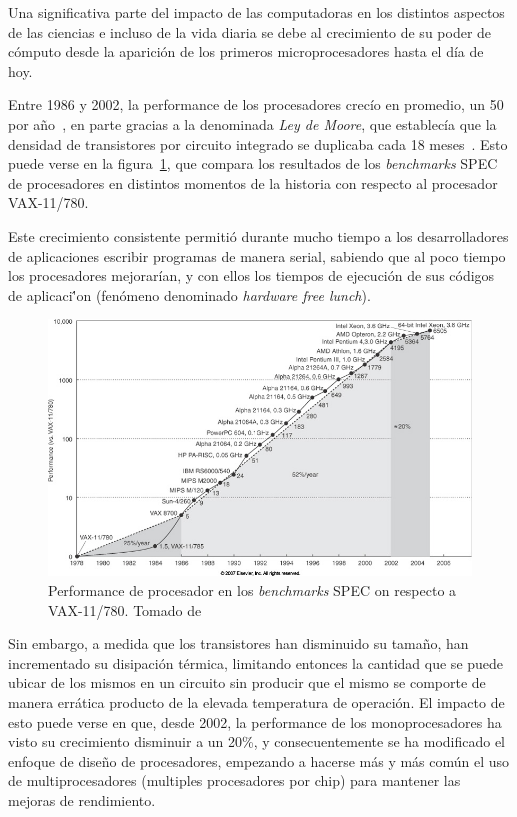 Una significativa parte del impacto de las computadoras en los distintos aspectos de las
ciencias e incluso de la vida diaria se debe al crecimiento de su
poder de c\'omputo desde la aparici\'on de los primeros microprocesadores hasta el
d\'ia de hoy.

Entre 1986 y 2002, la performance de los procesadores crec\'io en promedio, un 50%
por a\~no~\cite{Pacheco}, en parte gracias a la denominada \textit{Ley de Moore}, que
establec\'ia que la densidad de transistores por circuito integrado se duplicaba
cada 18 meses~\cite{HennessyPatterson}. Esto puede verse en la figura~\ref{processor_performance},
que compara los resultados de los \textit{benchmarks} SPEC de procesadores en distintos
momentos de la historia con respecto al procesador VAX-11/780.

Este crecimiento consistente permiti\'o durante mucho tiempo a los desarrolladores
de aplicaciones escribir programas de manera serial, sabiendo que al poco tiempo los procesadores
mejorar\'ian, y con ellos los tiempos de ejecuci\'on de sus c\'odigos de aplicaci\''on (fen\'omeno denominado
\textit{hardware free lunch}).

\begin{figure}[htbp]
    \centering
    \includegraphics[width=\textwidth]{images/processor-performance.jpg}
    \caption{Performance de procesador en los \textit{benchmarks} SPEC on respecto a VAX-11/780. Tomado de~\cite{HennessyPatterson}}
    \label{processor_performance}
\end{figure}

Sin embargo, a medida que los transistores han disminuido su tama\~no, han incrementado
su disipaci\'on t\'ermica, limitando entonces la cantidad que se puede ubicar de los mismos
en un circuito sin producir que el mismo se comporte de manera err\'atica producto
de la elevada temperatura de operaci\'on. El impacto de esto puede verse en que,
desde 2002, la performance de los monoprocesadores ha visto su crecimiento disminuir
a un 20\%, y consecuentemente se ha modificado el enfoque de dise\~no de procesadores, empezando
a hacerse m\'as y m\'as com\'un el uso de multiprocesadores (multiples procesadores
por chip) para mantener las mejoras de rendimiento.


